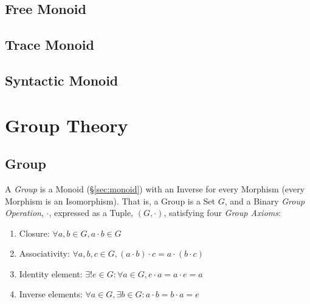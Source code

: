 \subsection{Free Monoid}\label{sec:free_monoid}

\subsection{Trace Monoid}\label{sec:trace_monoid}

\subsection{Syntactic Monoid}\label{sec:syntactic_monoid}



\section{Group Theory}\label{sec:group_theory}

\subsection{Group}\label{sec:group}

A \emph{Group} is a Monoid (\S\ref{sec:monoid}) with an Inverse for
every Morphism (every Morphism is an Isomorphism). That is, a Group is
a Set $G$, and a Binary \emph{Group Operation}, $\cdot$, expressed as
a Tuple, $(G,\cdot)$, satisfying four \emph{Group Axioms}:
\begin{enumerate}
    \item Closure: $\forall a,b \in G, a \cdot b \in G$
    \item Associativity: $\forall a,b,c \in G, (a \cdot b) \cdot c = a
      \cdot (b \cdot c)$
    \item Identity element: $\exists! e \in G : \forall a \in G,
      e \cdot a = a \cdot e = a$
    \item Inverse elements: $\forall a \in G, \exists b \in G :
      a \cdot b = b \cdot a = e$
\end{enumerate}

